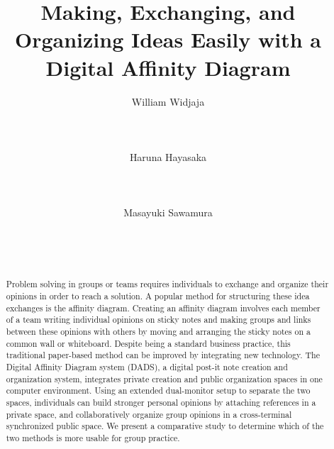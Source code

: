 \documentclass{sigchi}
\begin{document}
\title{Making, Exchanging, and Organizing Ideas Easily with a Digital Affinity Diagram}

\author{
  \alignauthor William Widjaja\\
    \\
    \\
    \\
  \alignauthor Haruna Hayasaka \\
    \\
    \\
    \\   
  \alignauthor Masayuki Sawamura \\
    \\
    \\
    \\
}

\maketitle

\begin{abstract}
Problem solving in groups or teams requires individuals to exchange and organize their opinions in order to reach a solution. A popular method for structuring these idea exchanges is the affinity diagram. Creating an affinity diagram involves each member of a team writing individual opinions on sticky notes and making groups and links between these opinions with others by moving and arranging the sticky notes on a common wall or whiteboard. Despite being a standard business practice, this traditional paper-based method can be improved by integrating new technology. The Digital Affinity Diagram system (DADS), a digital post-it note creation and organization system, integrates private creation and public organization spaces in one computer environment. Using an extended dual-monitor setup to separate the two spaces, individuals can build stronger personal opinions by attaching references in a private space, and collaboratively organize group opinions in a cross-terminal synchronized public space.  We present a comparative study to determine which of the two methods is more usable for group practice. 
\end{abstract}
\end{document}
